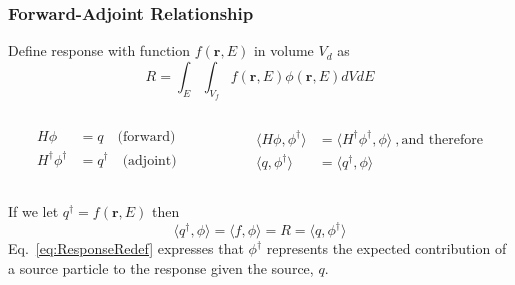 \documentclass[xcolor=x11names,compress]{beamer}
\renewcommand{\(}{\begin{columns}}
\renewcommand{\)}{\end{columns}}
\newcommand{\<}[1]{\begin{column}{#1}}
\renewcommand{\>}{\end{column}}
\newcommand{\ve}[1]{\ensuremath{\mathbf{#1}}}
\begin{document}
\begin{frame}[fragile]
  \frametitle{Forward-Adjoint Relationship}
Define response with function $f(\ve{r}, E)$ in volume $V_d$ as
%
\begin{equation}
 R = \int_E \int_{V_f} f(\ve{r}, E) \phi(\ve{r}, E) dV dE 
 \label{eq:Response}
\end{equation}
%
\begin{columns}
  \begin{column}{0.5\textwidth}
	\begin{align}
  	H\phi &= q \quad \text{(forward)}\nonumber \\
  	H^{\dagger} \phi^{\dagger} &= q^{\dagger} \quad 
  	\text{(adjoint)}\nonumber
  	\end{align}
  \end{column}
  \begin{column}{0.5\textwidth}
  	\begin{align}
  	\langle H\phi, \phi^{\dagger} \rangle &= \langle H^{\dagger} \phi^{\dagger}, \phi \rangle \:, \text{and therefore} \nonumber \\
  	\langle q, \phi^{\dagger} \rangle &= \langle q^{\dagger}, \phi \rangle \nonumber
  	\end{align}
  \end{column}
\end{columns}
\vspace*{1 em}
\pause
If we let $q^{\dagger} = f(\ve{r}, E)$ then
%
\begin{equation}
 \langle q^{\dagger}, \phi \rangle = \langle f, \phi \rangle = R = \langle q, \phi^{\dagger} \rangle
 \label{eq:ResponseRedef}
\end{equation}
%
Eq.\ \eqref{eq:ResponseRedef} expresses that $\phi^{\dagger}$ represents the expected contribution of a source particle to the response given the source, $q$.

\end{frame}
\end{document}
